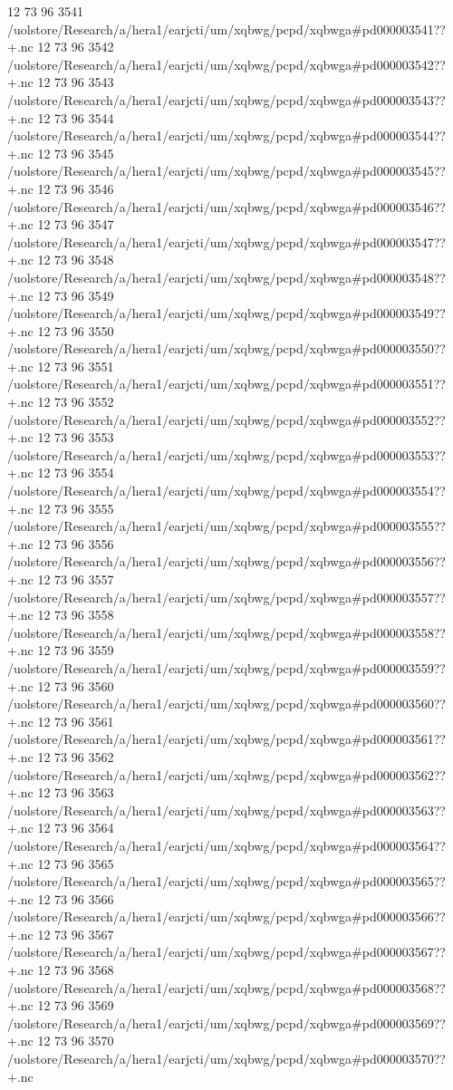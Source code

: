 12 73 96
3541
/uolstore/Research/a/hera1/earjcti/um/xqbwg/pcpd/xqbwga#pd000003541??+.nc
12 73 96
3542
/uolstore/Research/a/hera1/earjcti/um/xqbwg/pcpd/xqbwga#pd000003542??+.nc
12 73 96
3543
/uolstore/Research/a/hera1/earjcti/um/xqbwg/pcpd/xqbwga#pd000003543??+.nc
12 73 96
3544
/uolstore/Research/a/hera1/earjcti/um/xqbwg/pcpd/xqbwga#pd000003544??+.nc
12 73 96
3545
/uolstore/Research/a/hera1/earjcti/um/xqbwg/pcpd/xqbwga#pd000003545??+.nc
12 73 96
3546
/uolstore/Research/a/hera1/earjcti/um/xqbwg/pcpd/xqbwga#pd000003546??+.nc
12 73 96
3547
/uolstore/Research/a/hera1/earjcti/um/xqbwg/pcpd/xqbwga#pd000003547??+.nc
12 73 96
3548
/uolstore/Research/a/hera1/earjcti/um/xqbwg/pcpd/xqbwga#pd000003548??+.nc
12 73 96
3549
/uolstore/Research/a/hera1/earjcti/um/xqbwg/pcpd/xqbwga#pd000003549??+.nc
12 73 96
3550
/uolstore/Research/a/hera1/earjcti/um/xqbwg/pcpd/xqbwga#pd000003550??+.nc
12 73 96
3551
/uolstore/Research/a/hera1/earjcti/um/xqbwg/pcpd/xqbwga#pd000003551??+.nc
12 73 96
3552
/uolstore/Research/a/hera1/earjcti/um/xqbwg/pcpd/xqbwga#pd000003552??+.nc
12 73 96
3553
/uolstore/Research/a/hera1/earjcti/um/xqbwg/pcpd/xqbwga#pd000003553??+.nc
12 73 96
3554
/uolstore/Research/a/hera1/earjcti/um/xqbwg/pcpd/xqbwga#pd000003554??+.nc
12 73 96
3555
/uolstore/Research/a/hera1/earjcti/um/xqbwg/pcpd/xqbwga#pd000003555??+.nc
12 73 96
3556
/uolstore/Research/a/hera1/earjcti/um/xqbwg/pcpd/xqbwga#pd000003556??+.nc
12 73 96
3557
/uolstore/Research/a/hera1/earjcti/um/xqbwg/pcpd/xqbwga#pd000003557??+.nc
12 73 96
3558
/uolstore/Research/a/hera1/earjcti/um/xqbwg/pcpd/xqbwga#pd000003558??+.nc
12 73 96
3559
/uolstore/Research/a/hera1/earjcti/um/xqbwg/pcpd/xqbwga#pd000003559??+.nc
12 73 96
3560
/uolstore/Research/a/hera1/earjcti/um/xqbwg/pcpd/xqbwga#pd000003560??+.nc
12 73 96
3561
/uolstore/Research/a/hera1/earjcti/um/xqbwg/pcpd/xqbwga#pd000003561??+.nc
12 73 96
3562
/uolstore/Research/a/hera1/earjcti/um/xqbwg/pcpd/xqbwga#pd000003562??+.nc
12 73 96
3563
/uolstore/Research/a/hera1/earjcti/um/xqbwg/pcpd/xqbwga#pd000003563??+.nc
12 73 96
3564
/uolstore/Research/a/hera1/earjcti/um/xqbwg/pcpd/xqbwga#pd000003564??+.nc
12 73 96
3565
/uolstore/Research/a/hera1/earjcti/um/xqbwg/pcpd/xqbwga#pd000003565??+.nc
12 73 96
3566
/uolstore/Research/a/hera1/earjcti/um/xqbwg/pcpd/xqbwga#pd000003566??+.nc
12 73 96
3567
/uolstore/Research/a/hera1/earjcti/um/xqbwg/pcpd/xqbwga#pd000003567??+.nc
12 73 96
3568
/uolstore/Research/a/hera1/earjcti/um/xqbwg/pcpd/xqbwga#pd000003568??+.nc
12 73 96
3569
/uolstore/Research/a/hera1/earjcti/um/xqbwg/pcpd/xqbwga#pd000003569??+.nc
12 73 96
3570
/uolstore/Research/a/hera1/earjcti/um/xqbwg/pcpd/xqbwga#pd000003570??+.nc

